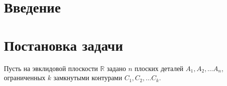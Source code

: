 \documentclass{article}
\begin{document}
\section{Введение}

\section{Постановка задачи}

Пусть на эвклидовой плоскости
$\mathbb R$ задано $n$ плоских деталей
$A_1, A_2, \dots A_n$,
ограниченных $k$ замкнутыми контурами
$C_1, C_2, \dots C_k$.
\end{document}
